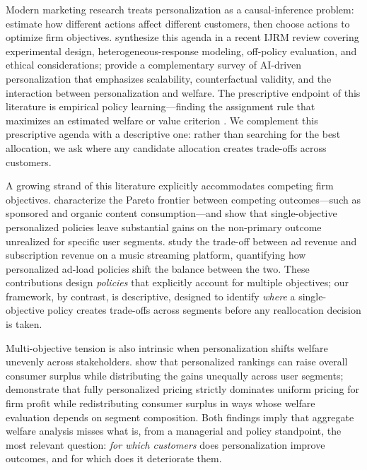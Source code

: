 \documentclass[11pt,letterpaper,english]{article}
\theoremstyle{definition}
\theoremstyle{definition}
\begin{document}
\begin{bibunit}
Modern marketing research treats personalization as a causal-inference problem: estimate how different actions affect different customers, then choose actions to optimize firm objectives. \citet{lemmens2025personalization} synthesize this agenda in a recent IJRM review covering experimental design, heterogeneous-response modeling, off-policy evaluation, and ethical considerations; \citet{rafieian2023ai} provide a complementary survey of AI-driven personalization that emphasizes scalability, counterfactual validity, and the interaction between personalization and welfare. The prescriptive endpoint of this literature is empirical policy learning---finding the assignment rule that maximizes an estimated welfare or value criterion \citep{kitagawa2018should, athey2021policy}. We complement this prescriptive agenda with a descriptive one: rather than searching for the best allocation, we ask where any candidate allocation creates trade-offs across customers.

A growing strand of this literature explicitly accommodates competing firm objectives. \citet{rafieian2025multiobjective} characterize the Pareto frontier between competing outcomes---such as sponsored and organic content consumption---and show that single-objective personalized policies leave substantial gains on the non-primary outcome unrealized for specific user segments. \citet{goli2025personalizing} study the trade-off between ad revenue and subscription revenue on a music streaming platform, quantifying how personalized ad-load policies shift the balance between the two. These contributions design \emph{policies} that explicitly account for multiple objectives; our framework, by contrast, is descriptive, designed to identify \emph{where} a single-objective policy creates trade-offs across segments before any reallocation decision is taken.

Multi-objective tension is also intrinsic when personalization shifts welfare unevenly across stakeholders. \citet{donnelly2024welfare} show that personalized rankings can raise overall consumer surplus while distributing the gains unequally across user segments; \citet{dube2023personalized} demonstrate that fully personalized pricing strictly dominates uniform pricing for firm profit while redistributing consumer surplus in ways whose welfare evaluation depends on segment composition. Both findings imply that aggregate welfare analysis misses what is, from a managerial and policy standpoint, the most relevant question: \emph{for which customers} does personalization improve outcomes, and for which does it deteriorate them.


\end{bibunit}
\end{document}
